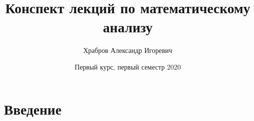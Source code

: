 \documentclass[12pt,letterpaper]{report}
\title{Конспект лекций по математическому анализу}
\author{Храбров Александр Игоревич}
\date{Первый курс, первый семестр 2020}
\begin{document}
\fi
\maketitle
\tableofcontents
\newpage
\chapter{Введение}
\end{document}
